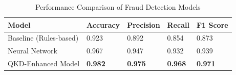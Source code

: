 \begin{table}[!htb]
\centering
\small
\begin{tabular}{|p{4.2cm}|p{2.5cm}|p{2.5cm}|p{2.5cm}|p{2.5cm}|}
\hline
\cellcolor{lightblue!30}\textbf{Model} & \cellcolor{lightblue!30}\textbf{Accuracy} & \cellcolor{lightblue!30}\textbf{Precision} & \cellcolor{lightblue!30}\textbf{Recall} & \cellcolor{lightblue!30}\textbf{F1 Score} \\
\hline
Baseline (Rules-based) & 0.923 & 0.892 & 0.854 & 0.873 \\
\hline
Neural Network & 0.967 & 0.947 & 0.932 & 0.939 \\
\hline
QKD-Enhanced Model & \textbf{0.982} & \textbf{0.975} & \textbf{0.968} & \textbf{0.971} \\
\hline
\end{tabular}
\caption{Performance Comparison of Fraud Detection Models}
\label{table:performance}
\end{table}